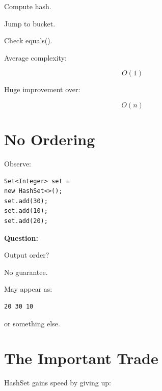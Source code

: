 \documentclass[11pt,a4paper]{book}
\begin{document}
Compute hash.


Jump to bucket.


Check equals().


Average complexity:

\[
O(1)
\]


Huge improvement over:

\[
O(n)
\]


\section{No Ordering}

Observe:

\begin{verbatim} 
Set<Integer> set =
new HashSet<>();
set.add(30);
set.add(10);
set.add(20);
\end{verbatim}


\textbf{\textbf{Question:}}

Output order?


No guarantee.


May appear as:

\begin{verbatim}
20 30 10
\end{verbatim}


or something else.


\section{The Important Trade}

HashSet gains speed by giving up:
\end{document}
